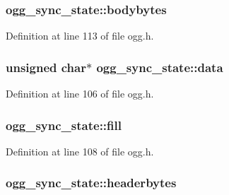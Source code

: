 \subsubsection[{\texorpdfstring{bodybytes}{bodybytes}}]{ ogg\+\_\+sync\+\_\+state\+::bodybytes}\hypertarget{structogg__sync__state_aa7ea6e81b751baaa04e4b49cb04e8317}{}\label{structogg__sync__state_aa7ea6e81b751baaa04e4b49cb04e8317}


Definition at line 113 of file ogg.\+h.

\subsubsection[{\texorpdfstring{data}{data}}]{\setlength{\rightskip}{0pt plus 5cm}unsigned char$\ast$ ogg\+\_\+sync\+\_\+state\+::data}\hypertarget{structogg__sync__state_adfc3f5d5a6434a582205ece0327fcc7d}{}\label{structogg__sync__state_adfc3f5d5a6434a582205ece0327fcc7d}


Definition at line 106 of file ogg.\+h.

\subsubsection[{\texorpdfstring{fill}{fill}}]{ ogg\+\_\+sync\+\_\+state\+::fill}\hypertarget{structogg__sync__state_a3afef65cd358eab5827304b8c2360c7f}{}\label{structogg__sync__state_a3afef65cd358eab5827304b8c2360c7f}


Definition at line 108 of file ogg.\+h.

\subsubsection[{\texorpdfstring{headerbytes}{headerbytes}}]{ ogg\+\_\+sync\+\_\+state\+::headerbytes}\hypertarget{structogg__sync__state_abb64d78f386bc413527df838f2f681d5}{}\label{structogg__sync__state_abb64d78f386bc413527df838f2f681d5}


